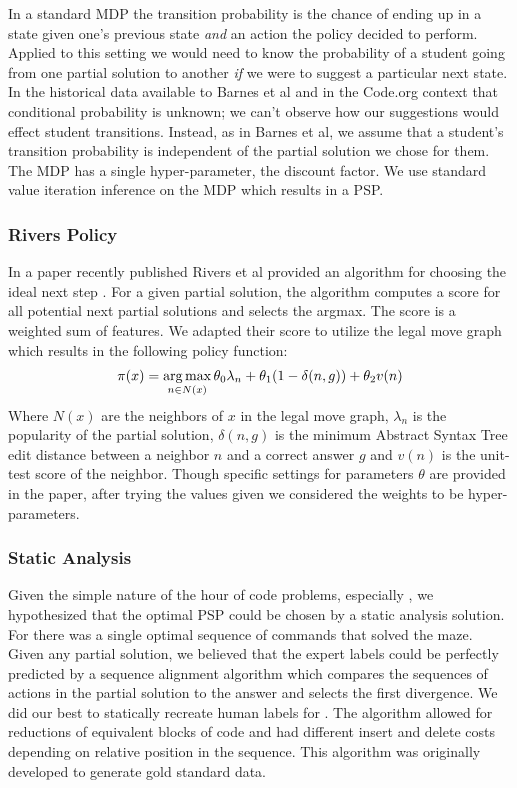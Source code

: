 In a standard MDP the transition probability is the chance of ending up in a state given one's previous state \emph{and} an action the policy decided to perform. Applied to this setting we would need to know the probability of a student going from one partial solution to another \emph{if} we were to suggest a particular next state. In the historical data available to Barnes et al and in the Code.org context that conditional probability is unknown; we can't observe how our suggestions would effect student transitions. Instead, as in Barnes et al, we assume that a student's transition probability is independent of the partial solution we chose for them. The MDP has a single hyper-parameter, the discount factor. We use standard value iteration \cite{shapley1953stochastic} inference on the MDP which results in a PSP. 

\subsubsection{Rivers Policy}
In a paper recently published Rivers et al provided an algorithm for choosing the ideal next step \cite{rivers2014automating}. For a given partial solution, the algorithm computes a score for all potential next partial solutions and selects the argmax. The score is a weighted sum of features. We adapted their score to utilize the legal move graph which results in the following policy function:
\begin{align*}
\pi(x) = \operatorname*{arg\,max}_{n \in N(x)} {\theta_0 \lambda_n + \theta_1 (1 - \delta(n, g)) + \theta_2 v(n)}
\end{align*}
Where $N(x)$ are the neighbors of $x$ in the legal move graph, $\lambda_n$ is the popularity of the partial solution, $\delta(n, g)$ is the minimum Abstract Syntax Tree edit distance between a neighbor $n$ and a correct answer $g$ and $v(n)$ is the unit-test score of the neighbor. Though specific settings for parameters $\theta$ are provided in the paper, after trying the values given we considered the weights to be hyper-parameters. 



\subsubsection{Static Analysis}
Given the simple nature of the hour of code problems, especially \Pa, we hypothesized that the optimal PSP could be chosen by a static analysis solution. For \Pa there was a single optimal sequence of commands that solved the maze. Given any partial solution, we believed that the expert labels could be perfectly predicted by a sequence alignment algorithm which compares the sequences of actions in the partial solution to the answer and selects the first divergence. We did our best to statically recreate human labels for \Pa. The algorithm allowed for reductions of equivalent blocks of code and had different insert and delete costs depending on relative position in the sequence. This algorithm was originally developed to generate gold standard data.


